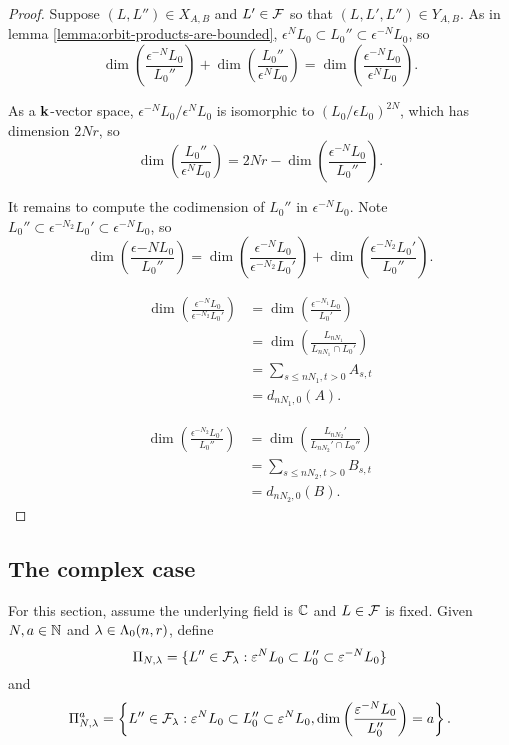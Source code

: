 \documentclass[a4paper, 11pt]{report}
\begin{document}
\begin{proof}
Suppose $(L,L'')\in X_{A,B}$ and $L'\in\mathcal{F}$ so that $(L,L',L'')\in Y_{A,B}$. As in lemma \ref{lemma:orbit-products-are-bounded}, $\epsilon^N L_0\subset L_0''\subset \epsilon^{-N}L_0$, so
\begin{equation*}
\dim\left(\frac{\epsilon^{-N}L_0}{L_0''}\right) + \dim\left(\frac{L_0''}{\epsilon^N L_0}\right) = \dim\left(\frac{\epsilon^{-N}L_0}{\epsilon^N L_0}\right).
\end{equation*}

As a $\mathbf{k}$-vector space, $\epsilon^{-N}L_0/\epsilon^N L_0$ is isomorphic to $(L_0/{\epsilon L_0})^{2N}$, which has dimension $2Nr$, so
\begin{equation*}
\dim\left(\frac{L_0''}{\epsilon^N L_0}\right) = 2Nr - \dim\left(\frac{\epsilon^{-N}L_0}{L_0''}\right).
\end{equation*}

It remains to compute the codimension of $L_0''$ in $\epsilon^{-N}L_0$. Note $L_0''\subset \epsilon^{-N_2}L_0'\subset \epsilon^{-N} L_0$, so
\begin{equation*}
\dim\left(\frac{\epsilon{-N}L_0}{L_0''}\right) = \dim\left(\frac{\epsilon^{-N}L_0}{\epsilon^{-N_2}L_0'}\right) + \dim\left(\frac{\epsilon^{-N_2}L_0'}{L_0''}\right).
\end{equation*}

\begin{align*}
\dim\left(\frac{\epsilon^{-N}L_0}{\epsilon^{-N_2}L_0'}\right)
&= \dim\left(\frac{\epsilon^{-N_1}L_0}{L_0'}\right)\\
&= \dim\left(\frac{L_{nN_1}}{L_{nN_1}\cap L_0'}\right)\\
&= \sum_{s\le nN_1, t>0} A_{s,t}\\
&= d_{nN_1,0}(A).
\end{align*}

\begin{align*}
\dim\left(\frac{\epsilon^{-N_2}L_0'}{L_0''}\right)
&= \dim\left(\frac{ L_{nN_2}'}{L_{nN_2}'\cap L_0''}\right)\\
&= \sum_{s\le nN_2, t>0} B_{s,t}\\
&= d_{nN_2,0}(B).
\end{align*}
\end{proof}

\subsection{The complex case}

For this section, assume the underlying field is $\mathbb{C}$ and $L\in\mathcal{F}$ is fixed. Given $N,a\in\mathbb{N}$ and $\lambda\in\Lambda_0(n,r)$, define
\begin{equation*}
\Pi_{N,\lambda} = \{L''\in\mathcal{F}_\lambda: \varepsilon^N L_0\subset L_0''\subset \varepsilon^{-N}L_0\}
\end{equation*}
and
\begin{equation*}
\Pi_{N,\lambda}^a = \left\{L''\in\mathcal{F}_\lambda: \varepsilon^N L_0\subset L_0''\subset \varepsilon^{N}L_0, \dim\left(\frac{\varepsilon^{-N}L_0}{L_0''}\right) = a\right\}.
\end{equation*}
\end{document}
